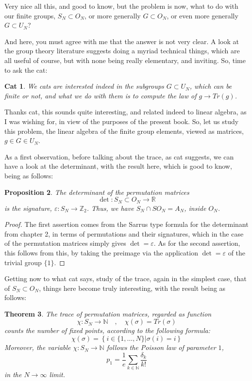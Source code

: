 \documentclass[12pt]{amsbook}
\newtheorem{theorem}{Theorem}[chapter]
\newtheorem{cat}[theorem]{Cat}
\newtheorem{proposition}[theorem]{Proposition}
\begin{document}
\bigskip

Very nice all this, and good to know, but the problem is now, what to do with our finite groups, $S_N\subset O_N$, or more generally $G\subset O_N$, or even more generally $G\subset U_N$?

\bigskip

And here, you must agree with me that the answer is not very clear. A look at the group theory literature suggests doing a myriad technical things, which are all useful of course, but with none being really elementary, and inviting. So, time to ask the cat:

\begin{cat}
We cats are interested indeed in the subgroups $G\subset U_N$, which can be finite or not, and what we do with them is to compute the law of $g\to Tr(g)$.
\end{cat}

Thanks cat, this sounds quite interesting, and related indeed to linear algebra, as I was wishing for, in view of the purposes of the present book. So, let us study this problem, the linear algebra of the finite group elements, viewed as matrices, $g\in G\in U_N$. 

\bigskip

As a first observation, before talking about the trace, as cat suggests, we can have a look at the determinant, with the result here, which is good to know, being as follows:

\begin{proposition}
The determinant of the permutation matrices
$$\det:S_N\subset O_N\to\mathbb R$$
is the signature, $\varepsilon:S_N\to\mathbb Z_2$. Thus, we have $S_N\cap SO_N=A_N$, inside $O_N$.
\end{proposition}

\begin{proof}
The first assertion comes from the Sarrus type formula for the determinant from chapter 2, in terms of permutations and their signatures, which in the case of the permutation matrices simply gives $\det=\varepsilon$. As for the second assertion, this follows from this, by taking the preimage via the application $\det=\varepsilon$ of the trivial group $\{1\}$.
\end{proof}

Getting now to what cat says, study of the trace, again in the simplest case, that of $S_N\subset O_N$, things here become truly interesting, with the result being as follows:

\begin{theorem}
The trace of permutation matrices, regarded as function
$$\chi:S_N\to\mathbb N\quad,\quad \chi(\sigma)=Tr(\sigma)$$
counts the number of fixed points, according to the following formula:
$$\chi(\sigma)=\left\{i\in\{1,\ldots,N\}\Big|\sigma(i)=i\right\}$$
Moreover, the variable $\chi:S_N\to\mathbb N$ follows the Poisson law of parameter $1$,
$$p_1=\frac{1}{e}\sum_{k\in\mathbb N}\frac{\delta_k}{k!}$$
in the $N\to\infty$ limit. 
\end{theorem}
\end{document}
